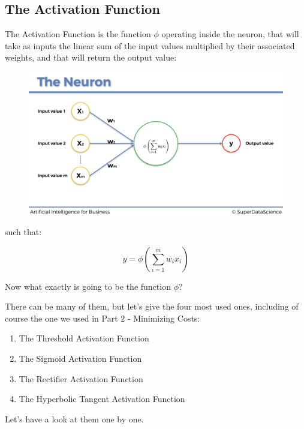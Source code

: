 \documentclass[]{book}
\begin{document}
\subsection{The Activation Function}

The Activation Function is the function \(\phi\) operating inside the neuron, that will take as inputs the linear sum of the input values multiplied by their associated weights, and that will return the output value:

\begin{figure}[!htbp]
        \begin{center}
            \includegraphics[scale=0.18]{ANN_9.png}
        \end{center}
\end{figure}

such that:

\begin{equation*}
    y = \phi\left( \sum_{i=1}^m w_i x_i \right)
\end{equation*}

Now what exactly is going to be the function \(\phi\)?

There can be many of them, but let's give the four most used ones, including of course the one we used in Part 2 - Minimizing Costs:

\begin{enumerate}
    \item The Threshold Activation Function
    \item The Sigmoid Activation Function
    \item The Rectifier Activation Function
    \item The Hyperbolic Tangent Activation Function
\end{enumerate}

Let's have a look at them one by one.
\end{document}
